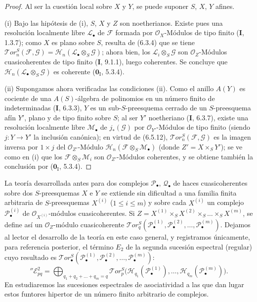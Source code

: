 \begin{proof}
Al ser la cuestión local sobre $X$ y $Y$, se puede suponer $S$, $X$, $Y$
afines.

\textnormal{(i)} Bajo las hipótesis de (i), $S$, $X$ y $Z$ son noetherianos.
Existe pues una resolución localmente libre $\mathscr L_\bullet$ de
$\mathscr F$ formada por $\mathscr O_X$-Módulos de tipo finito (\textbf{I}, 1.3.7); como
$X$ es plano sobre $S$, resulta de (6.3.4) que se tiene
$\mathscr{T}\!or_n^S(\mathscr F,\mathscr G)
=\mathscr H_n(\mathscr L_\bullet\otimes_S\mathscr G)$;
ahora bien, los $\mathscr L_i\otimes_S\mathscr G$ son $\mathscr O_Z$-Módulos
cuasicoherentes de tipo finito (\textbf{I}, 9.1.1), luego coherentes. Se concluye que
$\mathscr H_n(\mathscr L_\bullet\otimes_S\mathscr G)$ es coherente
($\mathbf{0}_{\mathrm I}$, 5.3.4).

\textnormal{(ii)} Supongamos ahora verificadas las condiciones (ii). Como
el anillo $A(Y)$ es cociente de una $A(S)$-álgebra de polinomios en un número finito
de indeterminadas (\textbf{I}, 6.3.3), $Y$ es un sub-$S$-preesquema cerrado de un
$S$-preesquema afín $Y'$, plano y de tipo finito sobre $S$; al ser $Y'$ noetheriano
(\textbf{I}, 6.3.7), existe una resolución localmente libre $\mathscr M_\bullet$ de
$j_*(\mathscr G)$ por $\mathscr O_{Y'}$-Módulos de tipo finito
(siendo $j:Y\to Y'$ la inclusión canónica); en virtud de (6.5.12),
$\mathscr{T}\!or_n^S(\mathscr F,\mathscr G)$ es la imagen inversa por
$1\times j$ del $\mathscr O_{Z'}$-Módulo
$\mathscr H_n(\mathscr F\otimes_S\mathscr M_\bullet)$ (donde
$Z'=X\times_S Y'$); se ve como en (i) que los
$\mathscr F\otimes_S\mathscr M_i$ son $\mathscr O_{Z'}$-Módulos
coherentes, y se obtiene también la conclusión por ($\mathbf{0}_{\mathrm I}$, 5.3.4).
\end{proof}

\begin{env}[6.5.15]
La teoría desarrollada antes para dos complejos $\mathscr P_\bullet$,
$\mathscr Q_\bullet$ de haces cuasicoherentes sobre dos $S$-preesquemas $X$ e $Y$ se extiende sin dificultad a una
familia finita arbitraria de $S$-preesquemas $X^{(i)}$ ($1\leqslant i\leqslant m$) y sobre
cada $X^{(i)}$ un complejo $\mathscr P_\bullet^{(i)}$ de $\mathscr O_{X^{(i)}}$-módulos
cuasicoherentes. Si
$Z=X^{(1)}\times_S X^{(2)}\times_S\ldots\times_S X^{(m)}$,
se define así un $\mathscr O_Z$-módulo cuasicoherente
$\mathscr{T}\!or_q^S(\mathscr P_\bullet^{(1)},\mathscr P_\bullet^{(2)},
\ldots,\mathscr P_\bullet^{(m)})$.
Dejamos al lector el desarrollo de la teoría en este caso general,
y registramos únicamente, para referencia posterior, el término
$E_2$ de la segunda sucesión espectral
(regular) cuyo resultado es
$\mathscr{T}\!or_\bullet^S(\mathscr P_\bullet^{(1)},
\mathscr P_\bullet^{(2)},\ldots,\mathscr P_\bullet^{(m)})$:
\[
  ''\mathscr E_{pq}^2
  =\bigoplus_{q_1+q_2+\ldots+q_m=q}
   \mathscr{T}\!or_p^S
   \bigl(\mathscr H_{q_1}(\mathscr P_\bullet^{(1)}),\ldots,
         \mathscr H_{q_m}(\mathscr P_\bullet^{(m)})\bigr).
  \tag{6.5.15.1}\label{III.6.5.15.1.fr}
\]
En  estudiaremos las sucesiones espectrales de
asociatividad a las que dan lugar estos funtores hipertor de un
número finito arbitrario de complejos.
\end{env}
